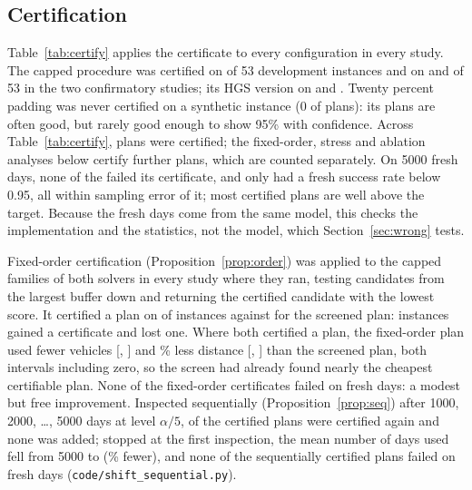 \documentclass[11pt,a4paper]{article}
\theoremstyle{remark}
\begin{document}
\subsection{Certification}\label{sec:cert-results}

Table~\ref{tab:certify} applies the certificate to every configuration in every
study. The capped procedure was certified on \CertDevCap{} of 53 development
instances and on \CertConeCap{} and \CertCtwoCap{} of 53 in the two confirmatory
studies; its HGS version on \CertDevHCap{} and \CertCtwoHCap. Twenty percent padding
was never certified on a synthetic instance (0 of \CertPadSynN{} plans): its plans
are often good, but rarely good enough to show 95\% with confidence. Across
Table~\ref{tab:certify}, \CertTotal{} plans were certified; the fixed-order, stress and
ablation analyses below certify further plans, which are counted separately. On 5000
fresh days, none of the \CertTotal{} failed
its certificate, and only \CertBelow{} had a fresh success rate below 0.95, all
within sampling error of it; most certified plans are well above the target. Because
the fresh days come from the same model, this checks the implementation and the
statistics, not the model, which Section~\ref{sec:wrong} tests.

Fixed-order certification (Proposition~\ref{prop:order}) was applied to the capped
families of both solvers in every study where they ran, testing candidates from the
largest buffer down and returning the certified candidate with the lowest score. It certified a plan on \FoFixed{} of
\FoInst{} instances against \FoProc{} for the screened plan: \FoFixedOnly{} instances
gained a certificate and \FoProcOnly{} lost one. Where both certified a plan, the
fixed-order plan used \FoFleetLess{} fewer vehicles [\FoFleetLessLo, \FoFleetLessHi] and
\FoDistLess\% less distance [\FoDistLessLo, \FoDistLessHi] than the screened plan, both
intervals including zero, so the screen had already found nearly the cheapest
certifiable plan. None of the fixed-order
certificates failed on fresh days: a modest but free improvement. Inspected
sequentially (Proposition~\ref{prop:seq}) after 1000, 2000, \ldots, 5000 days at level
$\alpha/5$, \SqCert{} of the \SqFixed{} certified plans were certified again and none
was added; \SqStopFirst{} stopped at the first inspection, the mean number of days used
fell from 5000 to \SqMeanDays{} (\SqSaved\% fewer), and none of the sequentially
certified plans failed on fresh days (\texttt{code/shift\_sequential.py}).


\end{document}
